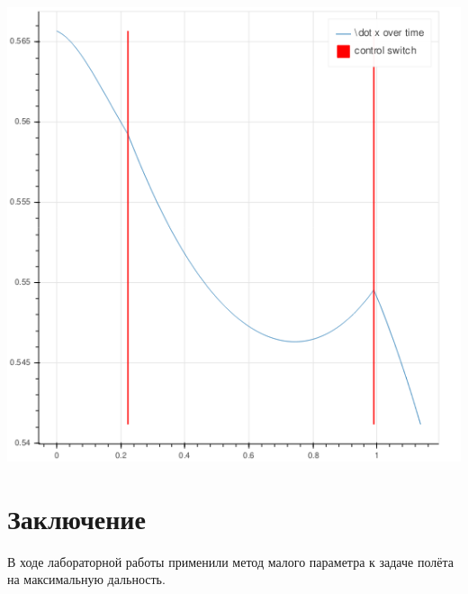 \documentclass{article}
\begin{document}
\begin{center}
\includegraphics[width=.6\textwidth]{dotx}
\end{center}

\section{Заключение}
В ходе лабораторной работы применили метод малого параметра к задаче полёта на
максимальную дальность.

\printbibliography[title={Список литературы},heading=bibintoc]
\end{document}
